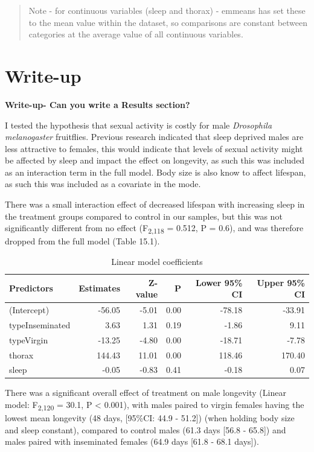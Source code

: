\documentclass[
]{book}
\begin{document}
\begin{quote}
Note - for continuous variables (sleep and thorax) - emmeans has set these to the mean value within the dataset, so comparisons are constant between categories at the average value of all continuous variables.
\end{quote}

\hypertarget{write-up}{%
\section{Write-up}\label{write-up}}

\textbf{Write-up- Can you write a Results section?}

I tested the hypothesis that sexual activity is costly for male \emph{Drosophila melanogaster} fruitflies. Previous research indicated that sleep deprived males are less attractive to females, this would indicate that levels of sexual activity might be affected by sleep and impact the effect on longevity, as such this was included as an interaction term in the full model. Body size is also know to affect lifespan, as such this was included as a covariate in the mode.

There was a small interaction effect of decreased lifespan with increasing sleep in the treatment groups compared to control in our samples, but this was not significantly different from no effect (F\textsubscript{2,118} = 0.512, P = 0.6), and was therefore dropped from the full model (Table 15.1).

\begin{table}

\caption{\label{tab:unnamed-chunk-527}Linear model coefficients}
\centering
\fontsize{16}{18}\selectfont
\begin{tabular}[t]{lrrrrr}
\toprule
Predictors & Estimates & Z-value & P & Lower 95\% CI & Upper 95\% CI\\
\midrule
(Intercept) & -56.05 & -5.01 & 0.00 & -78.18 & -33.91\\
typeInseminated & 3.63 & 1.31 & 0.19 & -1.86 & 9.11\\
typeVirgin & -13.25 & -4.80 & 0.00 & -18.71 & -7.78\\
thorax & 144.43 & 11.01 & 0.00 & 118.46 & 170.40\\
sleep & -0.05 & -0.83 & 0.41 & -0.18 & 0.07\\
\bottomrule
\end{tabular}
\end{table}

There was a significant overall effect of treatment on male longevity (Linear model: F\textsubscript{2,120} = 30.1, P \textless{} 0.001), with males paired to virgin females having the lowest mean longevity (48 days, {[}95\%CI: 44.9 - 51.2{]}) (when holding body size and sleep constant), compared to control males (61.3 days {[}56.8 - 65.8{]}) and males paired with inseminated females (64.9 days {[}61.8 - 68.1 days{]}).
\end{document}
